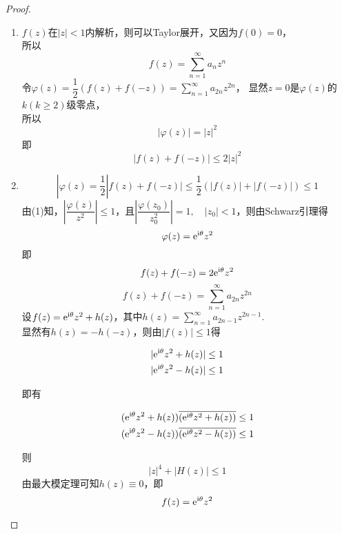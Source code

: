 \begin{proof}
    
    \begin{enumerate}
        
        \item
            $f(z)$在$|z| < 1$内解析，则可以\textup{Taylor}展开，又因为$f(0) = 0$，\\
            所以
            $$ f(z) = \sum\limits_{n = 1}^{\infty}{a_nz^n}$$
            令$\varphi(z) = \dfrac{1}{2} (f(z) + f(-z)) = \sum\limits_{n = 1}^{\infty}{a_{2n}z^{2n}}$，
            显然$z = 0$是$\varphi(z)$的$k(k \geq 2)$级零点，\\
            所以
            $$|\varphi(z)| = |z|^2$$
            即
            $$|f(z) + f(-z)| \leq 2|z|^2$$

        \item 
            $$|\varphi(z) = \dfrac{1}{2} |f(z) + f(-z)| \leq \dfrac{1}{2} (|f(z)| + |f(-z)|) \leq 1$$
            由\textup{(1)}知，$\left| \dfrac{\varphi(z)}{z^2} \right| \leq 1$，且$\left| \dfrac{\varphi(z_0)}{z_0^2} \right| = 1, \quad |z_0| < 1$，则由\textup{Schwarz}引理得
            $$\varphi(z) = \mathrm{e}^{\mathrm{i}\theta} z^2$$
            即
            $$f(z) + f(-z) = 2\mathrm{e}^{\mathrm{i}\theta} z^2$$
            $$f(z) + f(-z) = \sum\limits_{n = 1}^{\infty}{a_{2n}z^{2n}}$$
            设$f(z) = \mathrm{e}^{\mathrm{i}\theta} z^2 + h(z)$，其中$h(z) = \sum\limits_{n = 1}^{\infty}{a_{2n - 1}z^{2n - 1}}$. \\
            显然有$h(z) = -h(-z)$，则由$|f(z)| \leq 1$得

            \begin{align*}
                &|\mathrm{e}^{\mathrm{i}\theta} z^2 + h(z)| \leq 1 \\
                &|\mathrm{e}^{\mathrm{i}\theta} z^2 - h(z)| \leq 1
            \end{align*}

            即有

            \begin{align*}
                &(\mathrm{e}^{\mathrm{i}\theta} z^2 + h(z)) \overline{(\mathrm{e}^{\mathrm{i}\theta} z^2 + h(z))} \leq 1 \\
                &(\mathrm{e}^{\mathrm{i}\theta} z^2 - h(z)) \overline{(\mathrm{e}^{\mathrm{i}\theta} z^2 - h(z))} \leq 1
            \end{align*}

            则
            $$|z|^4 + |H(z)| \leq 1 $$
            由最大模定理可知$h(z)\equiv0$，即
            $$f(z) = \mathrm{e}^{\mathrm{i}\theta} z^2 $$

    \end{enumerate}

\end{proof}

